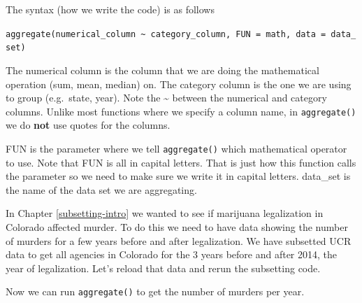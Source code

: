 \documentclass[
  12pt,
]{book}
\newenvironment{Shaded}{\begin{snugshade}}{\end{snugshade}}
\newcommand{\DecValTok}[1]{\textcolor[rgb]{0.00,0.00,0.81}{#1}}
\newcommand{\KeywordTok}[1]{\textcolor[rgb]{0.13,0.29,0.53}{\textbf{#1}}}
\newcommand{\NormalTok}[1]{#1}
\newcommand{\OperatorTok}[1]{\textcolor[rgb]{0.81,0.36,0.00}{\textbf{#1}}}
\newcommand{\StringTok}[1]{\textcolor[rgb]{0.31,0.60,0.02}{#1}}
\begin{document}
The syntax (how we write the code) is as follows

\texttt{aggregate(numerical\_column\ \textasciitilde{}\ category\_column,\ FUN\ =\ math,\ data\ =\ data\_set)}

The numerical column is the column that we are doing the mathematical operation (sum, mean, median) on. The category column is the one we are using to group (e.g.~state, year). Note the \textasciitilde{} between the numerical and category columns. Unlike most functions where we specify a column name, in \texttt{aggregate()} we do \textbf{not} use quotes for the columns.

FUN is the parameter where we tell \texttt{aggregate()} which mathematical operator to use. Note that FUN is all in capital letters. That is just how this function calls the parameter so we need to make sure we write it in capital letters. data\_set is the name of the data set we are aggregating.

In Chapter \ref{subsetting-intro} we wanted to see if marijuana legalization in Colorado affected murder. To do this we need to have data showing the number of murders for a few years before and after legalization. We have subsetted UCR data to get all agencies in Colorado for the 3 years before and after 2014, the year of legalization. Let's reload that data and rerun the subsetting code.

\begin{Shaded}
\end{Shaded}

Now we can run \texttt{aggregate()} to get the number of murders per year.
\end{document}
